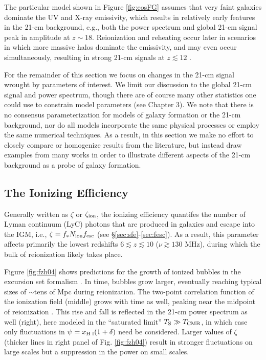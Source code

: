The particular model shown in Figure \ref{fig:eosFG} \cite{Mesinger2016} assumes that very faint galaxies dominate the UV and X-ray emissivity, which results in relatively early features in the 21-cm background, e.g., both the power spectrum and global 21-cm signal peak in amplitude at $z \sim 18$. Reionization and reheating occur later in scenarios in which more massive halos dominate the emissivity, and may even occur simultaneously, resulting in strong 21-cm signals at $z \lesssim 12$ \cite{Mesinger2016,Mirocha2017,Park2019}. 

For the remainder of this section we focus on changes in the 21-cm signal wrought by parameters of interest. We limit our discussion to the global 21-cm signal and power spectrum, though there are of course many other statistics one could use to constrain model parameters (see Chapter 3). We note that there is no consensus parameterization for models of galaxy formation or the 21-cm background, nor do all models incorporate the same physical processes or employ the same numerical techniques. As a result, in this section we make no effort to closely compare or homogenize results from the literature, but instead draw examples from many works in order to illustrate different aspects of the 21-cm background as a probe of galaxy formation. 

\subsection{The Ionizing Efficiency}
Generally written as $\zeta$ or $\zeta_{\text{ion}}$, the ionizing efficiency quantifes the number of Lyman continuum (LyC) photons that are produced in galaxies and escape into the IGM, i.e., $\zeta=f_{\ast} N_{\text{ion}} f_{\text{esc}}$ (see \S\ref{sec:sfe}-\ref{sec:fesc}). As a result, this parameter affects primarily the lowest redshifts $6 \lesssim z \lesssim 10$ ($\nu \gtrsim 130$ MHz), during which the bulk of reionization likely takes place.

Figure \ref{fig:fzh04} shows predictions for the growth of ionized bubbles in the excursion set formalism \cite{Furlanetto2004}. In time, bubbles grow larger, eventually reaching typical sizes of $\sim $tens of Mpc during reionization. The two-point correlation function of the ionization field (middle) grows with time as well, peaking near the midpoint of reionization \cite{Lidz2008}. This rise and fall is reflected in the 21-cm power spectrum as well (right), here modeled in the ``saturated limit'' $T_{\text{S}} \gg T_{\text{CMB}}$, in which case only fluctuations in $\psi = x_{\text{H } \textsc{i}} (1 + \delta)$ need be considered. Larger values of $\zeta$ (thicker lines in right panel of Fig. \ref{fig:fzh04}) result in stronger fluctuations on large scales but a suppression in the power on small scales.

